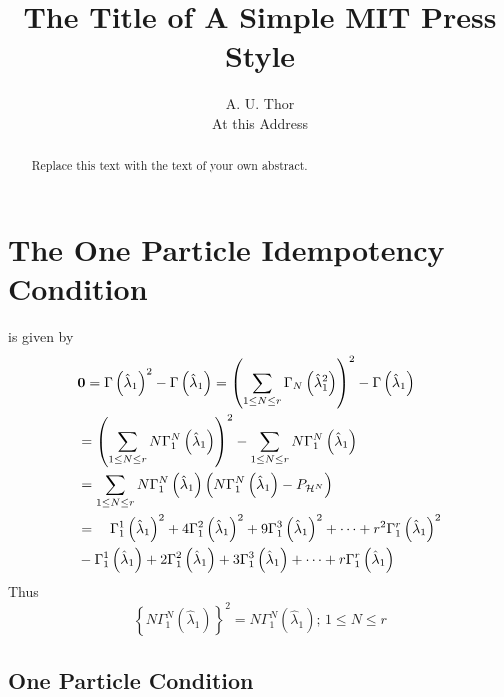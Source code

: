 \documentclass[12pt]{article}
\begin{document}
\title{The Title of A Simple MIT Press Style}
\author{A. U. Thor \\
At this Address}
\maketitle

\begin{abstract}
Replace this text with the text of your own abstract.
\end{abstract}

\section{The One Particle Idempotency Condition}

is given by%
\begin{align*}
& \mathbf{0}=\Gamma \left( \hat{\lambda}_{1}\right) ^{2}-\Gamma \left( \hat{%
\lambda}_{1}\right) =\left( \sum_{1\leq N\leq r}\Gamma _{N}\left( \hat{%
\lambda}_{1}^{2}\right) \right) ^{2}-\Gamma \left( \hat{\lambda}_{1}\right)
\\
& =\left( \sum_{1\leq N\leq r}N\Gamma _{1}^{N}\left( \hat{\lambda}%
_{1}\right) \right) ^{2}-\sum_{1\leq N\leq r}N\Gamma _{1}^{N}\left( \hat{%
\lambda}_{1}\right) \\
& =\sum_{1\leq N\leq r}N\Gamma _{1}^{N}\left( \hat{\lambda}_{1}\right)
\left( N\Gamma _{1}^{N}\left( \hat{\lambda}_{1}\right) -P_{\mathcal{H}%
^{N}}\right) \\
& =\quad \Gamma _{1}^{1}\left( \hat{\lambda}_{1}\right) ^{2}+4\Gamma
_{1}^{2}\left( \hat{\lambda}_{1}\right) ^{2}+9\Gamma _{1}^{3}\left( \hat{%
\lambda}_{1}\right) ^{2}+\cdots +r^{2}\Gamma _{1}^{r}\left( \hat{\lambda}%
_{1}\right) ^{2} \\
& -\Gamma _{1}^{1}\left( \hat{\lambda}_{1}\right) +2\Gamma _{1}^{2}\left( 
\hat{\lambda}_{1}\right) +3\Gamma _{1}^{3}\left( \hat{\lambda}_{1}\right)
+\cdots +r\Gamma _{1}^{r}\left( \hat{\lambda}_{1}\right)
\end{align*}%
Thus 
\begin{equation*}
\left\{ N\Gamma _{1}^{N}\left( \hat{\lambda}_{1}\right) \right\}
^{2}=N\Gamma _{1}^{N}\left( \hat{\lambda}_{1}\right) ;\,1\leq N\leq r 
\end{equation*}

\subsection{One Particle Condition}
\end{document}
